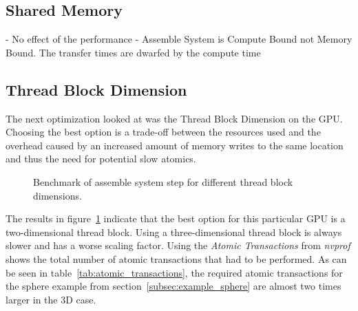 \documentclass[a4paper,11pt]{kth-mag}
\begin{document}
\subsection{Shared Memory}

- No effect of the performance
- Assemble System is Compute Bound not Memory Bound. The transfer times are dwarfed by the compute time

\subsection{Thread Block Dimension}

The next optimization looked at was the Thread Block Dimension on the GPU. Choosing the best option is a trade-off between the resources used and the overhead caused by an increased amount of memory writes to the same location and thus the need for potential slow atomics.

\begin{figure}[!htbp]
  \centering
  \caption{Benchmark of assemble system step for different thread block dimensions.}
  \label{fig:bench_cuda_thread_blocks}
\end{figure}

The results in figure~\ref{fig:bench_cuda_thread_blocks} indicate that the best option for this particular GPU is a two-dimensional thread block. Using a three-dimensional thread block is always slower and has a worse scaling factor. Using the \emph{Atomic Transactions} from \emph{nvprof} shows the total number of atomic transactions that had to be performed. As can be seen in table~\ref{tab:atomic_transactions}, the required atomic transactions for the sphere example from section~\ref{subsec:example_sphere} are almost two times larger in the 3D case.
\end{document}
